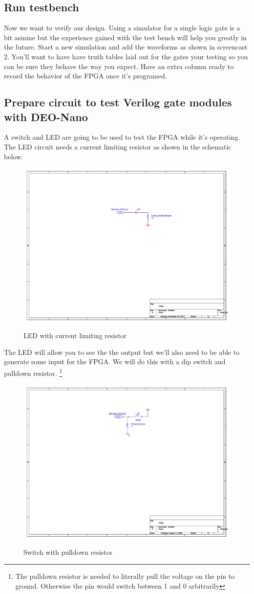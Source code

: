 \documentclass[12pt,journal]{IEEEtran}
\begin{document}
    \subsection{Run testbench}
    Now we want to verify our design. Using a simulator for a single logic gate is a bit asinine but
    the experience gained with the test bench will help you greatly in the future. Start a new simulation 
    and add the waveforms as shown in screencast 2. You'll want to have have truth tables laid out for the
    gates your testing so you can be sure they behave the way you expect. Have an extra column ready to record
    the behavior of the FPGA once it's programed.
    
    \subsection{Prepare circuit to test Verilog gate modules with DEO-Nano}
      A switch and LED are going to be used to test the FPGA while it's operating. The LED circuit needs a
      current limiting resistor as shown in the schematic below.
      \begin{figure}[H]
        \includegraphics[width=.48\textwidth]{Schematics/LED.pdf}
        \caption{LED with current limiting resistor}
      \end{figure}
      The LED will allow you to see the the output but we'll also need to be able to generate some input for
      the FPGA. We will do this with a dip switch and pulldown resistor. \footnote{The pulldown resistor is needed
      to literally pull the voltage on the pin to ground. Otherwise the pin would switch between 1 and 0 arbitrarily}
      \begin{figure}[H]
        \includegraphics[width=.48\textwidth]{Schematics/SwitchCircuit.pdf}
        \caption{Switch with pulldown resistor}
      \end{figure}
\end{document}
